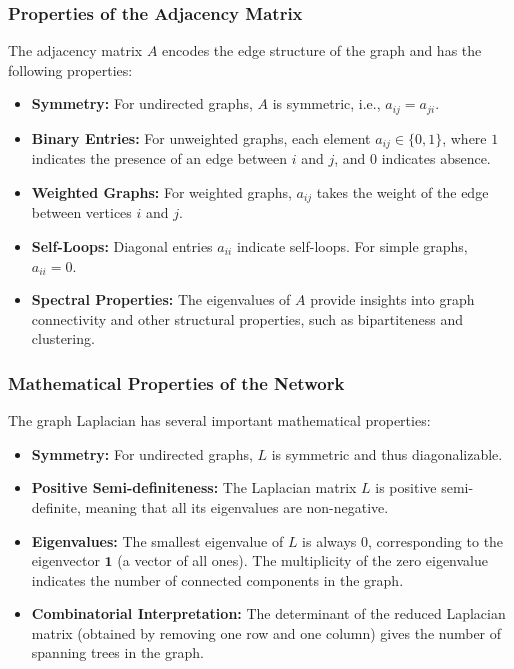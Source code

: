 \documentclass[English, Lau, oneside]{sapthesis}
\begin{document}
\subsubsection{Properties of the Adjacency Matrix}
\noindent The adjacency matrix \( A \) encodes the edge structure of the graph and has the following properties:\cite{ref11}
\begin{itemize}
    \item \textbf{Symmetry:} For undirected graphs, \( A \) is symmetric, i.e., \( a_{ij} = a_{ji} \).
    \item \textbf{Binary Entries:} For unweighted graphs, each element \( a_{ij} \in \{0, 1\} \), where \( 1 \) indicates the presence of an edge between \( i \) and \( j \), and \( 0 \) indicates absence.
    \item \textbf{Weighted Graphs:} For weighted graphs, \( a_{ij} \) takes the weight of the edge between vertices \( i \) and \( j \).
    \item \textbf{Self-Loops:} Diagonal entries \( a_{ii} \) indicate self-loops. For simple graphs, \( a_{ii} = 0 \).
    \item \textbf{Spectral Properties:} The eigenvalues of \( A \) provide insights into graph connectivity and other structural properties, such as bipartiteness and clustering.
\end{itemize}
\subsubsection{Mathematical Properties of the Network}
\noindent The graph Laplacian has several important mathematical properties:\cite{ref11}
\begin{itemize}
    \item \textbf{Symmetry:} For undirected graphs, \( L \) is symmetric and thus diagonalizable.
    \item \textbf{Positive Semi-definiteness:} The Laplacian matrix \( L \) is positive semi-definite, meaning that all its eigenvalues are non-negative.
    \item \textbf{Eigenvalues:} The smallest eigenvalue of \( L \) is always \( 0 \), corresponding to the eigenvector \( \mathbf{1} \) (a vector of all ones). The multiplicity of the zero eigenvalue indicates the number of connected components in the graph.
    \item \textbf{Combinatorial Interpretation:} The determinant of the reduced Laplacian matrix (obtained by removing one row and one column) gives the number of spanning trees in the graph.
\end{itemize}
\end{document}
